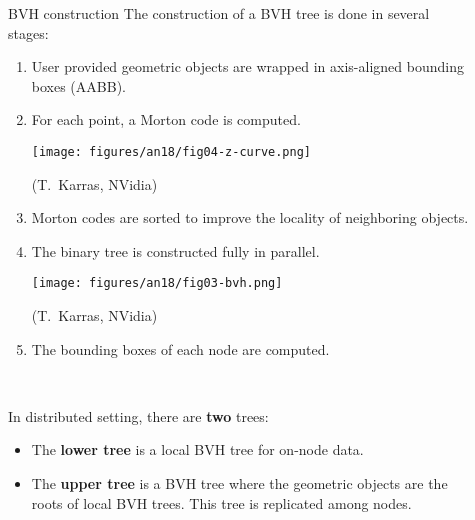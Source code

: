 \documentclass[final,hyperref={pdfpagelabels=false}]{beamer}
\begin{document}
\begin{frame}[t,fragile]
\begin{columns}[t]
\begin{column}{.450\textwidth}
\begin{block}{\centering BVH construction}
  The construction of a BVH tree is done in several stages:
  \begin{enumerate}
    \item User provided geometric objects are wrapped in axis-aligned bounding
      boxes (AABB).
    \item
      For each point, a Morton code is computed.

      \begin{center}
      \texttt{[image: figures/an18/fig04-z-curve.png]}

        {\small (T.~Karras, NVidia)}
      \end{center}
    \item
      Morton codes are sorted to improve the locality of neighboring objects.
    \item
      The binary tree is constructed fully in parallel.

      \begin{center}
      \texttt{[image: figures/an18/fig03-bvh.png]}

        {\small (T.~Karras, NVidia)}
      \end{center}
    \item The bounding boxes of each node are computed.
  \end{enumerate}

  \

  In distributed setting, there are \textbf{two} trees:
  \begin{itemize}
    \item
      The \textbf{lower tree} is a local BVH tree for on-node data.
    \item
      The \textbf{upper tree} is a BVH tree where the geometric objects are the
      roots of local BVH trees. This tree is replicated among nodes.
  \end{itemize}

\end{block}

\end{column} %

\begin{column}{.03\textwidth}\end{column}

\begin{column}{.480\textwidth}


\end{column}
\end{columns}
\end{frame}
\end{document}
